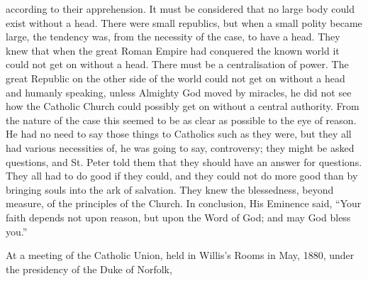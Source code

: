 according to their apprehension. It must be considered that no large
body could exist without a head. There were small republics, but when
a small polity became large, the tendency was, from the necessity of
the case, to have a head. They knew that when the great Roman Empire
had conquered the known world it could not get on without a head.
There must be a centralisation of power. The great Republic on the
other side of the world could not get on without a head and humanly
speaking, unless Almighty God moved by miracles, he did not see how
the Catholic Church could possibly get on without a central authority.
From the nature of the case this seemed to be as clear as possible to
the eye of reason. He had no need to say those things to Catholics
such as they were, but they all had various necessities of, he
was going to say, controversy; they might be asked questions, and St.
Peter told them that they should have an answer for questions. They
all had to do good if they could, and they could not do more good than
by bringing souls into the ark of salvation. They knew the
blessedness, beyond measure, of the principles of the Church. In
conclusion, His Eminence said, ``Your faith depends not upon reason,
but upon the Word of God; and may God bless you.''


At a meeting of the Catholic
Union, held in Willis's Rooms in May, 1880, under the presidency of
the Duke of Norfolk,


